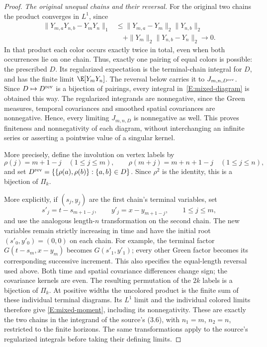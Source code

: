 \begin{proof}
\emph{The original unequal chains and their reversal.}
For the original two chains the product converges in $L^1$, since
\[
  \begin{split}
    \|Y_{m,a}Y_{n,b}-Y_mY_n\|_1
    &\le\|Y_{m,a}-Y_m\|_2\|Y_{n,b}\|_2\\
    &\quad+\|Y_m\|_2\|Y_{n,b}-Y_n\|_2\longrightarrow0.
  \end{split}
\]
In that product each color occurs exactly twice in total, even when
both occurrences lie on one chain. Thus, exactly one pairing of equal
colors is possible: the prescribed $D$. Its regularized expectation
is the terminal-chain integral for $D$, and has the finite limit
$\E[Y_mY_n]$. The reversal below carries it to $J_{m,n,D^{\rm rev}}$.
Since $D\mapsto D^{\rm rev}$ is a bijection of pairings, every
integral in~\eqref{E:mixed-diagram} is obtained this way.
The regularized integrands are nonnegative, since the Green measures,
temporal covariances and smoothed spatial covariances are nonnegative.
Hence, every limiting $J_{m,n,D}$ is nonnegative as well. This proves
finiteness and nonnegativity of each diagram, without interchanging
an infinite series or asserting a pointwise value of a singular kernel.

More precisely, define the involution on vertex labels by
\[
  \rho(j)=m+1-j\quad(1\le j\le m),\qquad
  \rho(m+j)=m+n+1-j\quad(1\le j\le n),
\]
and set $D^{\rm rev}=\{\{\rho(a),\rho(b)\}:\{a,b\}\in D\}$.
Since $\rho^2$ is the identity, this is a bijection of $\Pi_k$.

More explicitly, if $(s_j,y_j)$ are the first chain's terminal
variables, set
\[
  s'_j=t-s_{m+1-j},\qquad y'_j=x-y_{m+1-j},
  \qquad 1\le j\le m,
\]
and use the analogous length-$n$ transformation on the second chain.
The new variables remain strictly increasing in time and have the
initial root $(s'_0,y'_0)=(0,0)$ on each chain. For example, the
terminal factor $G(t-s_m,x-y_m)$ becomes $G(s'_1,y'_1)$;
every other Green factor becomes its corresponding successive
increment. This also specifies the equal-length reversal used above.
Both time and spatial covariance differences change sign; the covariance
kernels are even. The resulting permutation of the $2k$ labels is a
bijection of $\Pi_k$. At positive widths the uncolored product is
the finite sum of these individual terminal diagrams. Its $L^1$
limit and the individual colored limits therefore give
\eqref{E:mixed-moment}, including its
nonnegativity. These are exactly the two chains in the integrand of
the source's (3.6), with $n_1=m$, $n_2=n$, restricted to the finite
horizons. The same transformations apply to the source's regularized
integrals before taking their defining limits.


\end{proof}
